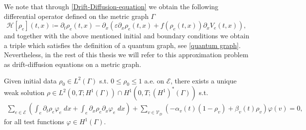 We note that through \cref{Drift-Diffusion-equation} we obtain the following differential operator defined on the metric graph $\Gamma$
\begin{equation} 
    \label{eq:Hamiltonian}
    \mathcal{H} [\rho_e] (t,x) \coloneqq \partial_t \rho_e (t,x)  - \partial_x (\varepsilon \partial_x \rho_e (t,x) + f(\rho_e (t,x) ) \partial_x V_e (t,x)),
\end{equation}
and together with the above mentioned initial and boundary conditions we obtain a triple which satisfies the definition of a quantum graph, see \cref{quantum graph}. Nevertheless, in the rest of this thesis we will refer to this approximation problem as drift-diffusion equations on a metric graph. 







\begin{theorem} 
    Given initial data $\rho_0 \in L^2(\Gamma)$ s.t. $0 \le \rho_0 \le 1$ a.e. on $\mathcal{E}$, there exists a unique weak solution $\rho \in L^2(0,T; H^1(\Gamma)) \cap H^1(0,T; (H^1)^*(\Gamma))$ s.t.
	\begin{align*}
		\sum_{e \in \mathcal{E}} \left(\int_e  \partial_t \rho_e \varphi_e \;dx + \int_e \partial_x \rho_e\partial_x \varphi_e \;dx\right) + \sum_{v \in \mathcal{V}_D} (-\alpha_v(t) (1-\rho_v) + \beta_v(t) \rho_v)\varphi(v) = 0,
	\end{align*}
	for all test functions $\varphi \in H^1(\Gamma)$.
\end{theorem}



